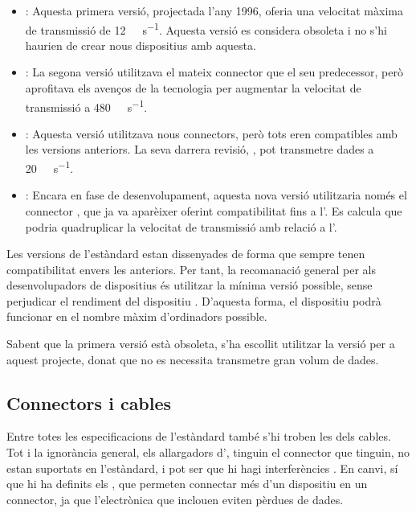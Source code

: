 \begin{itemize}
    \item {}: Aquesta primera versió, projectada l'any 1996, oferia
    una velocitat màxima de transmissió de
    \SI[round-mode=places,round-precision=0]{12}{\mega\bit\per\second}.
    Aquesta versió es considera obsoleta i no s'hi haurien de crear nous dispositius
    amb aquesta.
    \item {}: La segona versió utilitzava el mateix connector que el
    seu predecessor, però aprofitava els avenços de la tecnologia per
    augmentar la velocitat de transmissió a
    \SI[round-mode=places,round-precision=0]{480}{\mega\bit\per\second}.
    \item {}: Aquesta versió utilitzava nous connectors, però tots
    eren compatibles amb les versions anteriors. La seva darrera revisió,
    , pot transmetre dades a
    \SI[round-mode=places,round-precision=0]{20}{\giga\bit\per\second}.
    \item {}: Encara en fase de desenvolupament, aquesta nova versió
    utilitzaria només el connector , que ja va aparèixer oferint
    compatibilitat fins a l'. Es calcula que podria quadruplicar
    la velocitat de transmissió amb relació a l'.
\end{itemize}

Les versions de l'estàndard estan dissenyades de forma que sempre tenen
compatibilitat envers les anteriors. Per tant, la recomanació general per als
desenvolupadors de dispositius és utilitzar la mínima versió possible, sense
perjudicar el rendiment del dispositiu  \cite{Axelson2015USB}. D'aquesta forma,
el dispositiu podrà funcionar en el nombre màxim d'ordinadors possible.

Sabent que la primera versió està obsoleta, s'ha escollit utilitzar la versió
 per a aquest projecte, donat que no es necessita transmetre gran
volum de dades.

\subsection{Connectors i cables}

Entre totes les especificacions de l'estàndard  també s'hi troben les
dels cables. Tot i la ignorància general, els allargadors d', tinguin
el connector que tinguin, no estan suportats en l'estàndard, i pot ser que
hi hagi interferències \cite{Contributors2024USB}. En canvi, sí que
hi ha definits els , que permeten connectar més d'un dispositiu en un
connector, ja que l'electrònica que inclouen eviten pèrdues de dades.

